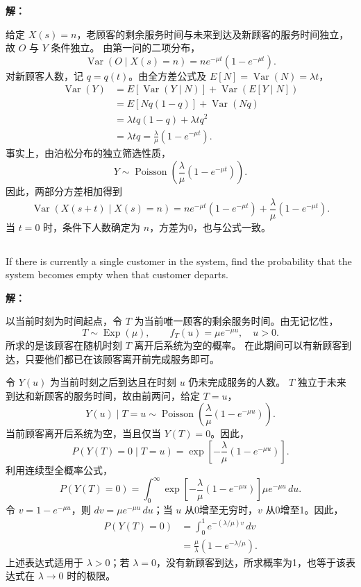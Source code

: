 \documentclass[12pt,a4paper]{article}
\begin{document}
\begin{answerbox}
\textbf{解：}

给定 $X(s)=n$，老顾客的剩余服务时间与未来到达及新顾客的服务时间独立，故 $O$ 与 $Y$ 条件独立。
由第一问的二项分布，
$$
\operatorname{Var}(O\mid X(s)=n)=ne^{-\mu t}(1-e^{-\mu t}).
$$
对新顾客人数，记 $q=q(t)$。由全方差公式及 $E[N]=\operatorname{Var}(N)=\lambda t$，
$$
\begin{aligned}
\operatorname{Var}(Y)
&=E[\operatorname{Var}(Y\mid N)]+\operatorname{Var}(E[Y\mid N])\\
&=E[Nq(1-q)]+\operatorname{Var}(Nq)\\
&=\lambda t q(1-q)+\lambda t q^2\\
&=\lambda t q=\frac{\lambda}{\mu}(1-e^{-\mu t}).
\end{aligned}
$$
事实上，由泊松分布的独立筛选性质，
$$
Y\sim\operatorname{Poisson}\left(\frac{\lambda}{\mu}(1-e^{-\mu t})\right).
$$
因此，两部分方差相加得到
$$
\boxed{\operatorname{Var}(X(s+t)\mid X(s)=n)
=ne^{-\mu t}(1-e^{-\mu t})+\frac{\lambda}{\mu}(1-e^{-\mu t})}.
$$
当 $t=0$ 时，条件下人数确定为 $n$，方差为0，也与公式一致。

\end{answerbox}


\subsection{}

If there is currently a single customer in the system, find the probability that the system becomes empty when that customer departs.

\begin{answerbox}
\textbf{解：}

以当前时刻为时间起点，令 $T$ 为当前唯一顾客的剩余服务时间。由无记忆性，
$$
T\sim\operatorname{Exp}(\mu),\qquad f_T(u)=\mu e^{-\mu u},\quad u>0.
$$
所求的是该顾客在随机时刻 $T$ 离开后系统为空的概率。
在此期间可以有新顾客到达，只要他们都已在该顾客离开前完成服务即可。

令 $Y(u)$ 为当前时刻之后到达且在时刻 $u$ 仍未完成服务的人数。
$T$ 独立于未来到达和新顾客的服务时间，故由前两问，给定 $T=u$，
$$
Y(u)\mid T=u\sim\operatorname{Poisson}\left(\frac{\lambda}{\mu}(1-e^{-\mu u})\right).
$$
当前顾客离开后系统为空，当且仅当 $Y(T)=0$。因此，
$$
P(Y(T)=0\mid T=u)
=\exp\left[-\frac{\lambda}{\mu}(1-e^{-\mu u})\right].
$$
利用连续型全概率公式，
$$
P(Y(T)=0)=\int_0^\infty
\exp\left[-\frac{\lambda}{\mu}(1-e^{-\mu u})\right]\mu e^{-\mu u}\,du.
$$
令 $v=1-e^{-\mu u}$，则 $dv=\mu e^{-\mu u}\,du$；当 $u$ 从0增至无穷时，$v$ 从0增至1。因此，
$$
\begin{aligned}
P(Y(T)=0)&=\int_0^1 e^{-(\lambda/\mu)v}\,dv\\
&=\frac{\mu}{\lambda}(1-e^{-\lambda/\mu}) .
\end{aligned}
$$
上述表达式适用于 $\lambda>0$；若 $\lambda=0$，没有新顾客到达，所求概率为1，也等于该表达式在 $\lambda\to0$ 时的极限。

\end{answerbox}
\end{document}
